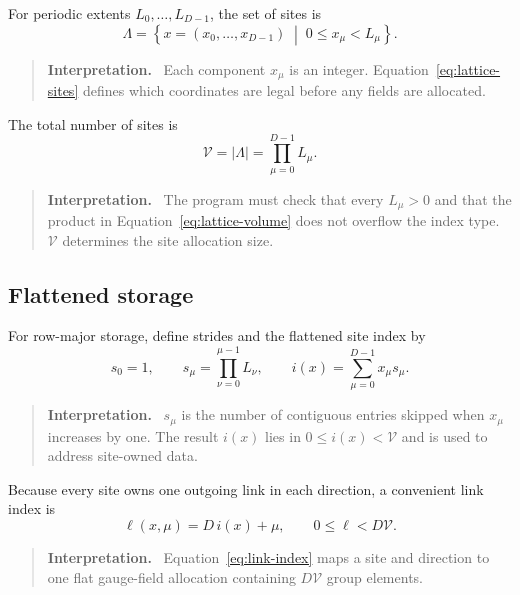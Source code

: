 \documentclass[11pt]{article}
\newcommand{\Vlat}{\mathcal{V}}
\newenvironment{interpretation}
  {\begin{quote}\small\noindent\textbf{Interpretation.}\ }
  {\end{quote}}
\begin{document}
For periodic extents \(L_0,\ldots,L_{D-1}\), the set of sites is
\begin{equation}
  \Lambda =
  \left\{x=(x_0,\ldots,x_{D-1})\;\middle|\;
  0\leq x_\mu<L_\mu\right\}.
  \label{eq:lattice-sites}
\end{equation}

\begin{interpretation}
Each component \(x_\mu\) is an integer. Equation~\eqref{eq:lattice-sites}
defines which coordinates are legal before any fields are allocated.
\end{interpretation}

The total number of sites is
\begin{equation}
  \Vlat = |\Lambda| = \prod_{\mu=0}^{D-1}L_\mu.
  \label{eq:lattice-volume}
\end{equation}

\begin{interpretation}
The program must check that every \(L_\mu>0\) and that the product in
Equation~\eqref{eq:lattice-volume} does not overflow the index type.
\(\Vlat\) determines the site allocation size.
\end{interpretation}

\subsection{Flattened storage}

For row-major storage, define strides and the flattened site index by
\begin{equation}
  s_0=1,\qquad
  s_\mu=\prod_{\nu=0}^{\mu-1}L_\nu,\qquad
  i(x)=\sum_{\mu=0}^{D-1}x_\mu s_\mu.
  \label{eq:site-index}
\end{equation}

\begin{interpretation}
\(s_\mu\) is the number of contiguous entries skipped when \(x_\mu\)
increases by one. The result \(i(x)\) lies in
\(0\leq i(x)<\Vlat\) and is used to address site-owned data.
\end{interpretation}

Because every site owns one outgoing link in each direction, a convenient link
index is
\begin{equation}
  \ell(x,\mu)=D\,i(x)+\mu,
  \qquad 0\leq\ell<D\Vlat.
  \label{eq:link-index}
\end{equation}

\begin{interpretation}
Equation~\eqref{eq:link-index} maps a site and direction to one flat gauge-field
allocation containing \(D\Vlat\) group elements.
\end{interpretation}
\end{document}
